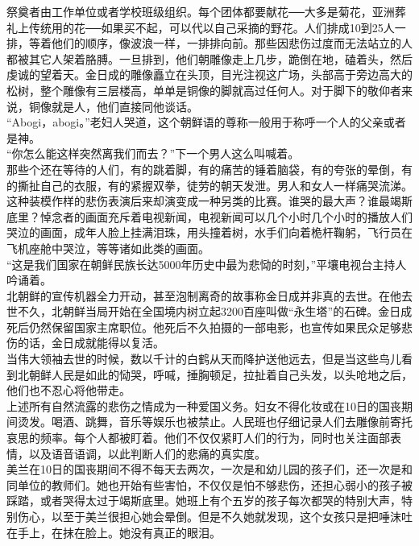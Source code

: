 祭奠者由工作单位或者学校班级组织。每个团体都要献花──大多是菊花，亚洲葬礼上传统用的花──如果买不起，可以代以自己采摘的野花。人们排成10到25人一排，等着他们的顺序，像波浪一样，一排排向前。那些因悲伤过度而无法站立的人都被其它人架着胳膊。一旦排到，他们朝雕像走上几步，跪倒在地，磕着头，然后虔诚的望着天。金日成的雕像矗立在头顶，目光注视这广场，头部高于旁边高大的松树，整个雕像有三层楼高，单单是铜像的脚就高过任何人。对于脚下的敬仰者来说，铜像就是人，他们直接同他谈话。\\

“Abogi，abogi。”老妇人哭道，这个朝鲜语的尊称一般用于称呼一个人的父亲或者是神。\\

“你怎么能这样突然离我们而去？”下一个男人这么叫喊着。\\

那些个还在等待的人们，有的跳着脚，有的痛苦的锤着脑袋，有的夸张的晕倒，有的撕扯自己的衣服，有的紧握双拳，徒劳的朝天发泄。男人和女人一样痛哭流涕。\\

这种装模作样的悲伤表演后来却演变成一种另类的比赛。谁哭的最大声？谁最竭斯底里？悼念者的画面充斥着电视新闻，电视新闻可以几个小时几个小时的播放人们哭泣的画面，成年人脸上挂满泪珠，用头撞着树，水手们向着桅杆鞠躬，飞行员在飞机座舱中哭泣，等等诸如此类的画面。\\

“这是我们国家在朝鲜民族长达5000年历史中最为悲恸的时刻，”平壤电视台主持人吟诵着。\\

北朝鲜的宣传机器全力开动，甚至泡制离奇的故事称金日成并非真的去世。在他去世不久，北朝鲜当局开始在全国境内树立起3200百座叫做“永生塔”的石碑。金日成死后仍然保留国家主席职位。他死后不久拍摄的一部电影，也宣传如果民众足够悲伤的话，金日成就能得以复活。\\

当伟大领袖去世的时候，数以千计的白鹤从天而降护送他远去，但是当这些鸟儿看到北朝鲜人民是如此的恸哭，呼喊，捶胸顿足，拉扯着自己头发，以头呛地之后，他们也不忍心将他带走。\\

上述所有自然流露的悲伤之情成为一种爱国义务。妇女不得化妆或在10日的国丧期间烫发。喝酒、跳舞，音乐等娱乐也被禁止。人民班也仔细记录人们去雕像前寄托哀思的频率。每个人都被盯着。他们不仅仅紧盯人们的行为，同时也关注面部表情，以及语音语调，以此判断人们的悲痛的真实度。\\

美兰在10日的国丧期间不得不每天去两次，一次是和幼儿园的孩子们，还一次是和同单位的教师们。她也开始有些害怕，不仅仅是怕不够悲伤，还担心弱小的孩子被踩踏，或者哭得太过于竭斯底里。她班上有个五岁的孩子每次都哭的特别大声，特别伤心，以至于美兰很担心她会晕倒。但是不久她就发现，这个女孩只是把唾沫吐在手上，在抹在脸上。她没有真正的眼泪。\\

